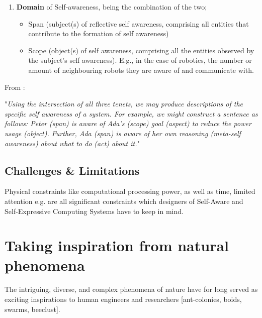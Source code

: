 \begin{enumerate}
		\item \textbf{Domain} of Self-awareness, being the combination of the two;
			\begin{itemize}
				\item Span (subject(s) of reflective self awareness, comprising all entities that contribute to the formation of self awareness)
				\item Scope (object(s) of self awareness, comprising all the entities observed by the subject's self awareness). E.g., in the case of robotics, the number or amount of neighbouring robots they are aware of and communicate with.
			\end{itemize}
	\end{enumerate}

	From \cite{sacs17_ch3}:

	"\textit{Using the intersection of all three tenets, we may produce descriptions of the
	specific self awareness of a system. For example, we might construct a sentence as
	follows: Peter (span) is aware of Ada’s (scope) goal (aspect) to reduce the power usage
	(object). Further, Ada (span) is aware of her own reasoning (meta-self awareness) about what to do (act) about it.}"


	\subsection{Challenges \& Limitations}

	Physical constraints like computational processing power, as well as time, limited attention e.g. are all significant constraints which designers of Self-Aware and Self-Expressive Computing Systems have to keep in mind.




\section{Taking inspiration from natural phenomena}
The intriguing, diverse, and complex phenomena of nature have for long served as exciting inspirations to human engineers and researchers [ant-colonies, boids, swarms, beeclust].


